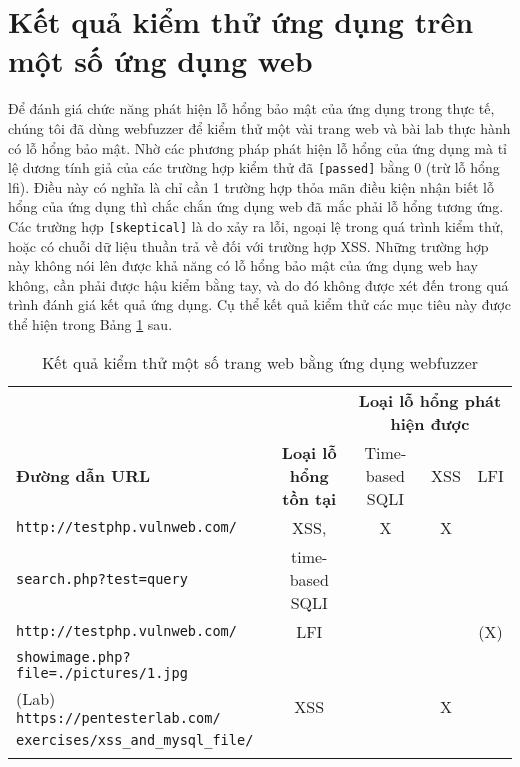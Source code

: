 \section{Kết quả kiểm thử ứng dụng trên một số ứng dụng web}
Để đánh giá chức năng phát hiện lỗ hổng bảo mật của ứng dụng trong thực tế, chúng tôi đã dùng webfuzzer để kiểm thử một vài trang web và bài lab thực hành có lỗ hổng bảo mật. Nhờ các phương pháp phát hiện lỗ hổng của ứng dụng mà tỉ lệ dương tính giả của các trường hợp kiểm thử đã \texttt{[passed]} bằng 0 (trừ lỗ hổng \acrshort{lfi}). Điều này có nghĩa là chỉ cần 1 trường hợp thỏa mãn điều kiện nhận biết lỗ hổng của ứng dụng thì chắc chắn ứng dụng web đã mắc phải lỗ hổng tương ứng. Các trường hợp \texttt{[skeptical]} là do xảy ra lỗi, ngoại lệ trong quá trình kiểm thử, hoặc có chuỗi dữ liệu thuần trả về đối với trường hợp XSS. Những trường hợp này không nói lên được khả năng có lỗ hổng bảo mật của ứng dụng web hay không, cần phải được hậu kiểm bằng tay, và do đó không được xét đến trong quá trình đánh giá kết quả ứng dụng. Cụ thể kết quả kiểm thử các mục tiêu này được thể hiện trong Bảng \ref{tab:testing-results} sau.\par
\begin{table}[ht]
    \centering
    \caption{Kết quả kiểm thử một số trang web bằng ứng dụng webfuzzer}
    \label{tab:testing-results}
    \begin{tabular}[ht]{lcccc}
        \toprule[1pt]\midrule[0.3pt]
            &{}&\multicolumn{3}{c}{\textbf{Loại lỗ hổng phát hiện được}}\\ \cmidrule{3-5}\textbf{Đường dẫn URL} &\textbf{Loại lỗ hổng tồn tại}&Time-based SQLI&XSS&LFI\\ 
        \midrule
            \texttt{http://testphp.vulnweb.com/}&XSS,&X&X& \\
            \texttt{search.php?test=query}&time-based SQLI& & & \\
            \addlinespace
            \texttt{http://testphp.vulnweb.com/}&LFI& & &(X)\\
            \texttt{showimage.php?file=./pictures/1.jpg}& & & & \\
            \addlinespace
            (Lab) \texttt{https://pentesterlab.com/}&XSS&&X& \\
            \texttt{exercises/xss\_and\_mysql\_file/}& & & & \\
            \addlinespace
        \midrule[0.3pt]\bottomrule[1pt]
    \end{tabular}
\end{table}
